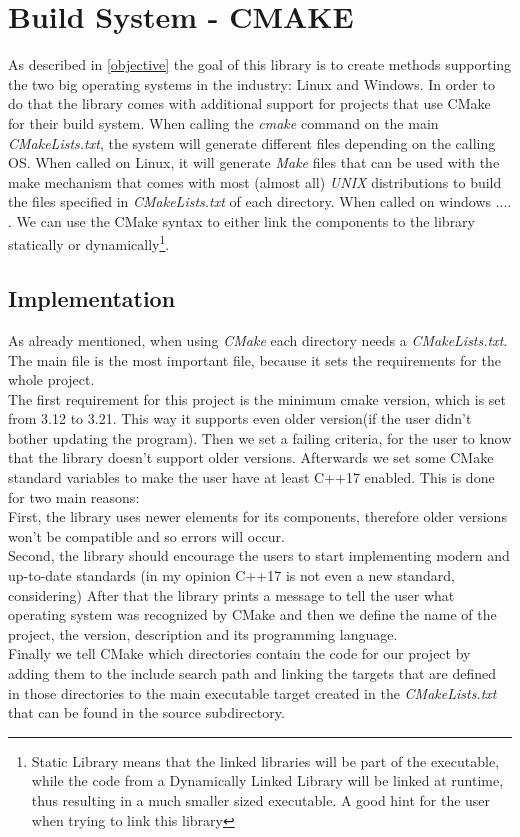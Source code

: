 \section{Build System - CMAKE}
As described in \ref{objective} the goal of this library is to create methods supporting the two big operating systems in the industry: Linux and Windows. In order to do that the library comes with additional support for projects that use CMake for their build system. When calling the \textit{cmake} command on the main \textit{CMakeLists.txt}, the system will generate different files depending on the calling OS. When called on Linux, it will generate \textit{Make} files that can be used with the make mechanism that comes with most (almost all) \textit{UNIX} distributions to build the files specified in \textit{CMakeLists.txt} of each directory. When called on windows .... .
We can use the CMake syntax to either link the components to the library statically or dynamically\footnote{Static Library means that the linked libraries will be part of the executable, while the code from a Dynamically Linked Library will be linked at runtime, thus resulting in a much smaller sized executable. A good hint for the user when trying to link this library}. 
\subsection{Implementation}
As already mentioned, when using \textit{CMake} each directory needs a \textit{CMakeLists.txt}. The main file is the most important file, because it sets the requirements for the whole project.\\
The first requirement for this project is the minimum cmake version, which is set from 3.12 to 3.21. This way it supports even older version(if the user didn't bother updating the program). Then we set a failing criteria, for the user to know that the library doesn't support older versions. Afterwards we set some CMake standard variables to make the user have at least C++17 enabled. This is done for two main reasons: \\
First, the library uses newer elements for its components, therefore older versions won't be compatible and so errors will occur.\\
Second, the library should encourage the users to start implementing modern and up-to-date standards (in my opinion C++17 is not even a new standard, considering)
After that the library prints a message to tell the user what operating system was recognized by CMake and then we define the name of the project, the version, description and its programming language.\\
Finally we tell CMake which directories contain the code for our project by adding them to the include search path and linking the targets that are defined in those directories to the main executable target created in the \textit{CMakeLists.txt} that can be found in the source subdirectory.\textsl{}